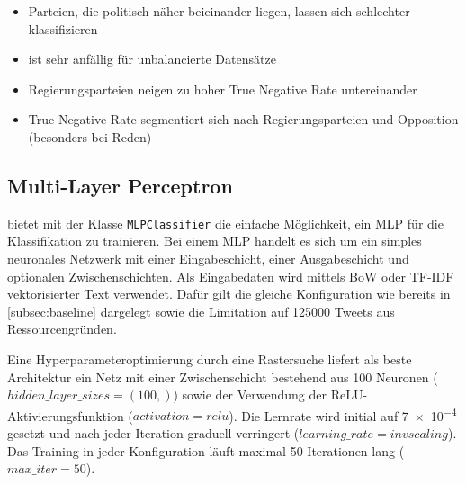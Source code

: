 
\begin{itemize}
    \item Parteien, die politisch näher beieinander liegen, lassen sich schlechter klassifizieren
    \item \ft ist sehr anfällig für unbalancierte Datensätze
    \item Regierungsparteien neigen zu hoher True Negative Rate untereinander
    \item True Negative Rate segmentiert sich nach Regierungsparteien und Opposition (besonders bei Reden)
\end{itemize}

\subsection{Multi-Layer Perceptron}

\sk bietet mit der Klasse \texttt{MLPClassifier} die einfache Möglichkeit, ein \ac{MLP} für die Klassifikation zu trainieren. Bei einem \ac{MLP} handelt es sich um ein simples neuronales Netzwerk mit einer Eingabeschicht, einer Ausgabeschicht und optionalen Zwischenschichten. Als Eingabedaten wird mittels \ac{BoW} oder \ac{TF-IDF} vektorisierter Text verwendet. Dafür gilt die gleiche Konfiguration wie bereits in \autoref{subsec:baseline} dargelegt sowie die Limitation auf \num{125000} Tweets aus Ressourcengründen.

Eine Hyperparameteroptimierung durch eine Rastersuche liefert als beste Architektur ein Netz mit einer Zwischenschicht bestehend aus \num{100} Neuronen (\(hidden\_layer\_sizes=(100,)\)) sowie der Verwendung der \ac{ReLU}-Aktivierungsfunktion (\(activation=relu\)). Die Lernrate wird initial auf \num{7e-4} gesetzt und nach jeder Iteration graduell verringert (\(learning\_rate=invscaling\)). Das Training in jeder Konfiguration läuft maximal \num{50} Iterationen lang (\(max\_iter=50\)).

